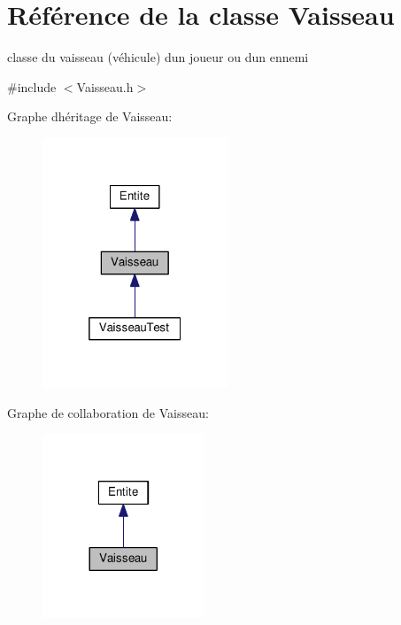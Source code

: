\hypertarget{class_vaisseau}{}\section{Référence de la classe Vaisseau}
\label{class_vaisseau}


classe du vaisseau (véhicule) d\textquotesingle{}un joueur ou d\textquotesingle{}un ennemi  




{\ttfamily \#include $<$Vaisseau.\+h$>$}



Graphe d\textquotesingle{}héritage de Vaisseau\+:\nopagebreak
\begin{figure}[H]
\begin{center}
\leavevmode
\includegraphics[width=157pt]{class_vaisseau__inherit__graph}
\end{center}
\end{figure}


Graphe de collaboration de Vaisseau\+:\nopagebreak
\begin{figure}[H]
\begin{center}
\leavevmode
\includegraphics[width=137pt]{class_vaisseau__coll__graph}
\end{center}
\end{figure}
